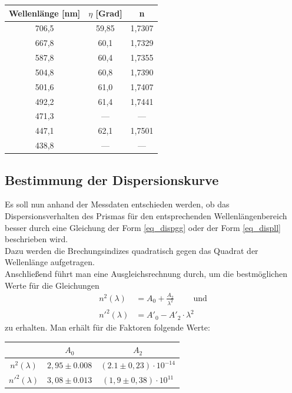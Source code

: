 \begin{table}[H]
\begin{tabular}{|c|c|c|}
Wellenlänge [nm] & $\eta$ [Grad] & n \\ \hline
706,5	&59,85	&1,7307 \\ \hline
667,8	&60,1	&1,7329 \\ \hline
587,8	&60,4	&1,7355 \\ \hline
504,8	&60,8	&1,7390 \\ \hline
501,6	&61,0		&1,7407 \\ \hline
492,2	&61,4	&1,7441 \\ \hline
471,3	&---&		---		 \\ \hline
447,1	&62,1&	1,7501 \\ \hline
438,8	&---	&	--- \\ \hline
\end{tabular} 
\end{table}

\subsection{Bestimmung der Dispersionskurve}
Es soll nun anhand der Messdaten entschieden werden, ob das Dispersionsverhalten des Prismas für den entsprechenden Wellenlängenbereich besser durch eine Gleichung der Form \eqref{eq_dispgg} oder der Form \eqref{eq_displl} beschrieben wird.\\
Dazu werden die Brechungsindizes quadratisch gegen das Quadrat der Wellenlänge aufgetragen.\\

Anschließend führt man eine Ausgleichsrechnung durch, um die bestmöglichen Werte für die Gleichungen
\begin{align}
n^2(\lambda) &= A_0 + \frac{A_2}{\lambda^2} \qquad \text{ und}
\label{eq_n^2}\\
n'^2(\lambda) &= A'_0 - A'_2\cdot\lambda^2
\end{align}
zu erhalten.
\newpage
Man erhält für die Faktoren folgende Werte:
\begin{table}[H]
\begin{tabular}{c|c|c}
 & $A_0$ & $A_2$ \\ 
\hline 
$n^2(\lambda)$ &  $2,95 \pm 0.008$ & $(2.1 \pm 0,23)\cdot 10^{-14}$ \\ 
\hline 
$n'^2(\lambda)$ & $3,08 \pm 0.013$ & $(1,9 \pm 0,38)\cdot 10^{11}$ \\ 
\hline 
\end{tabular} 
\end{table}

